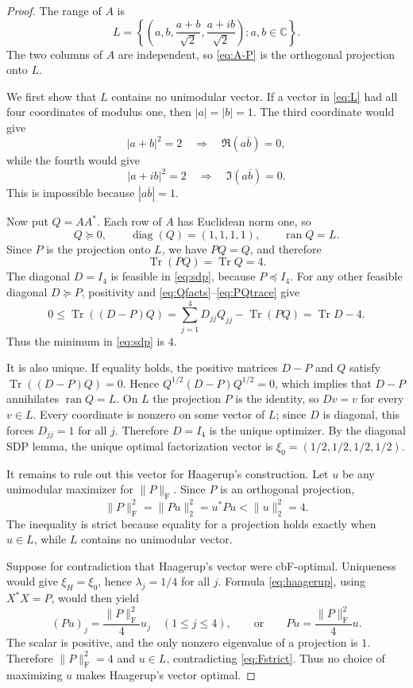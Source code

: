 \documentclass[11pt]{article}
\newcommand{\C}{\mathbb C}
\newcommand{\Tr}{\operatorname{Tr}}
\newcommand{\diag}{\operatorname{diag}}
\newcommand{\ran}{\operatorname{ran}}
\newcommand{\F}{\mathrm{F}}
\begin{document}
\begin{proof}
The range of $A$ is
\begin{equation}
 L=\left\{\left(a,b,\frac{a+b}{\sqrt2},
                 \frac{a+ib}{\sqrt2}\right):a,b\in\C\right\}.
 \label{eq:L}
\end{equation}
The two columns of $A$ are independent, so \eqref{eq:A-P} is the orthogonal
projection onto $L$.

We first show that $L$ contains no unimodular vector.  If a vector in
\eqref{eq:L} had all four coordinates of modulus one, then $|a|=|b|=1$.
The third coordinate would give
\[
 |a+b|^2=2 \quad\Longrightarrow\quad \Re(a\overline b)=0,
\]
while the fourth would give
\[
 |a+ib|^2=2 \quad\Longrightarrow\quad \Im(a\overline b)=0.
\]
This is impossible because $|a\overline b|=1$.

Now put $Q=AA^*$.  Each row of $A$ has Euclidean norm one, so
\begin{equation}
 Q\succeq0,\qquad \diag(Q)=(1,1,1,1),\qquad \ran Q=L.
 \label{eq:Qfacts}
\end{equation}
Since $P$ is the projection onto $L$, we have $PQ=Q$, and therefore
\begin{equation}
 \Tr(PQ)=\Tr Q=4.
 \label{eq:PQtrace}
\end{equation}
The diagonal $D=I_4$ is feasible in \eqref{eq:sdp}, because $P\preceq I_4$.
For any other feasible diagonal $D\succeq P$, positivity and
\eqref{eq:Qfacts}--\eqref{eq:PQtrace} give
\[
 0\le\Tr((D-P)Q)
   =\sum_{j=1}^4D_{jj}Q_{jj}-\Tr(PQ)
   =\Tr D-4.
\]
Thus the minimum in \eqref{eq:sdp} is $4$.

It is also unique.  If equality holds, the positive matrices $D-P$ and $Q$
satisfy $\Tr((D-P)Q)=0$.  Hence
$Q^{1/2}(D-P)Q^{1/2}=0$, which implies that $D-P$ annihilates
$\ran Q=L$.  On $L$ the projection $P$ is the identity, so $Dv=v$ for every
$v\in L$.  Every coordinate is nonzero on some vector of $L$; since $D$ is
diagonal, this forces $D_{jj}=1$ for all $j$.  Therefore $D=I_4$ is the
unique optimizer.  By the diagonal SDP lemma, the unique optimal
factorization vector is $\xi_0=(1/2,1/2,1/2,1/2)$.

It remains to rule out this vector for Haagerup's construction.  Let $u$ be
any unimodular maximizer for $\|P\|_{\F}$.  Since $P$ is an orthogonal
projection,
\begin{equation}
 \|P\|_{\F}^2=\|Pu\|_2^2=u^*Pu<\|u\|_2^2=4.
 \label{eq:Fstrict}
\end{equation}
The inequality is strict because equality for a projection holds exactly when
$u\in L$, while $L$ contains no unimodular vector.

Suppose for contradiction that Haagerup's vector were cbF-optimal.  Uniqueness
would give $\xi_H=\xi_0$, hence $\lambda_j=1/4$ for all $j$.  Formula
\eqref{eq:haagerup}, using $X^*X=P$, would then yield
\[
 (Pu)_j=\frac{\|P\|_{\F}^2}{4}u_j\quad(1\le j\le4),
 \qquad\text{or}\qquad
 Pu=\frac{\|P\|_{\F}^2}{4}u.
\]
The scalar is positive, and the only nonzero eigenvalue of a projection is
$1$.  Therefore $\|P\|_{\F}^2=4$ and $u\in L$, contradicting
\eqref{eq:Fstrict}.  Thus no choice of maximizing $u$ makes Haagerup's vector
optimal.
\end{proof}
\end{document}
